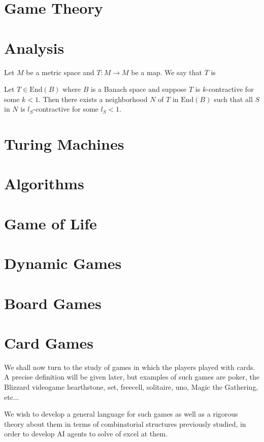 \documentclass[]{article}
\theoremstyle{definition}
\theoremstyle{definition}
\newcommand{\raw}{\rightarrow}
\begin{document}
	\section{Game Theory}
	
	
	\section{Analysis}
	
	Let $M$ be a metric space and $T:M \raw M$ be a map. We say that $T$ is 
	
	
	Let $T \in \text{End}(B)$ where $B$ is a Banach space and suppose $T$ is $k$-contractive for some $k < 1$. Then there exists a neighborhood $N$ of $T$ in $\text{End}(B)$ such that all $S$ in $N$ is $l_S$-contractive for some $l_S < 1$.
	
	\section{Turing Machines}
	\section{Algorithms}
	\section{Game of Life}
	\section{Dynamic Games}
	
	\section{Board Games}
	
	\section{Card Games}
	
	We shall now turn to the study of games in which the players played with cards. A precise definition will be given later, but examples of such games are poker, the Blizzard videogame hearthstone, set, freecell, solitaire, uno, Magic the Gathering, etc...
	
	We wish to develop a general language for such games as well as a rigorous theory about them in terms of combinatorial structures previously studied, in order to develop AI agents to solve of excel at them.
	
\end{document}
